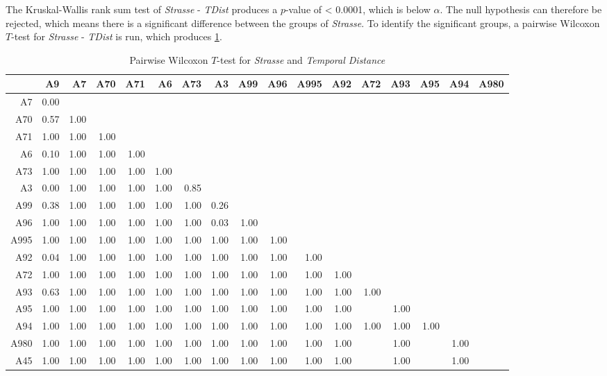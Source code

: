The Kruskal-Wallis rank sum test of \textit{Strasse} - \textit{TDist} produces a $p$-value of < 0.0001, which is below $\alpha$. The null hypothesis can therefore be rejected, which means there is a significant difference between the groups of \textit{Strasse}. To identify the significant groups, a pairwise Wilcoxon $T$-test for \textit{Strasse} - \textit{TDist} is run, which produces \cref{tbl:wilcoxon_arbis_matched_Strasse_TDist}. 
\begin{table}[ht!]
	\tiny
	\setlength{\tabcolsep}{4pt}
	\centering
	\begin{tabular}{rrrrrrrrrrrrrrrrr}
		\hline
			& A9 & A7 & A70 & A71 & A6 & A73 & A3 & A99 & A96 & A995 & A92 & A72 & A93 & A95 & A94 & A980 \\ 
		\hline
		A7   & 0.00 &  &  &  &  &  &  &  &  &  &  &  &  &  &  &  \\ 
		A70  & 0.57 & 1.00 &  &  &  &  &  &  &  &  &  &  &  &  &  &  \\ 
		A71  & 1.00 & 1.00 & 1.00 &  &  &  &  &  &  &  &  &  &  &  &  &  \\ 
		A6   & 0.10 & 1.00 & 1.00 & 1.00 &  &  &  &  &  &  &  &  &  &  &  &  \\ 
		A73  & 1.00 & 1.00 & 1.00 & 1.00 & 1.00 &  &  &  &  &  &  &  &  &  &  &  \\ 
		A3   & 0.00 & 1.00 & 1.00 & 1.00 & 1.00 & 0.85 &  &  &  &  &  &  &  &  &  &  \\ 
		A99  & 0.38 & 1.00 & 1.00 & 1.00 & 1.00 & 1.00 & 0.26 &  &  &  &  &  &  &  &  &  \\ 
		A96  & 1.00 & 1.00 & 1.00 & 1.00 & 1.00 & 1.00 & 0.03 & 1.00 &  &  &  &  &  &  &  &  \\ 
		A995 & 1.00 & 1.00 & 1.00 & 1.00 & 1.00 & 1.00 & 1.00 & 1.00 & 1.00 &  &  &  &  &  &  &  \\ 
		A92  & 0.04 & 1.00 & 1.00 & 1.00 & 1.00 & 1.00 & 1.00 & 1.00 & 1.00 & 1.00 &  &  &  &  &  &  \\ 
		A72  & 1.00 & 1.00 & 1.00 & 1.00 & 1.00 & 1.00 & 1.00 & 1.00 & 1.00 & 1.00 & 1.00 &  &  &  &  &  \\ 
		A93  & 0.63 & 1.00 & 1.00 & 1.00 & 1.00 & 1.00 & 1.00 & 1.00 & 1.00 & 1.00 & 1.00 & 1.00 &  &  &  &  \\ 
		A95  & 1.00 & 1.00 & 1.00 & 1.00 & 1.00 & 1.00 & 1.00 & 1.00 & 1.00 & 1.00 & 1.00 &  & 1.00 &  &  &  \\ 
		A94  & 1.00 & 1.00 & 1.00 & 1.00 & 1.00 & 1.00 & 1.00 & 1.00 & 1.00 & 1.00 & 1.00 & 1.00 & 1.00 & 1.00 &  &  \\ 
		A980 & 1.00 & 1.00 & 1.00 & 1.00 & 1.00 & 1.00 & 1.00 & 1.00 & 1.00 & 1.00 & 1.00 &  & 1.00 &  & 1.00 &  \\ 
		A45  & 1.00 & 1.00 & 1.00 & 1.00 & 1.00 & 1.00 & 1.00 & 1.00 & 1.00 & 1.00 & 1.00 &  & 1.00 &  & 1.00 &  \\ 
		\bottomrule
	\end{tabular}
	\caption{Pairwise Wilcoxon $T$-test for \textit{Strasse} and \textit{Temporal Distance}}
	\label{tbl:wilcoxon_arbis_matched_Strasse_TDist}
\end{table}
